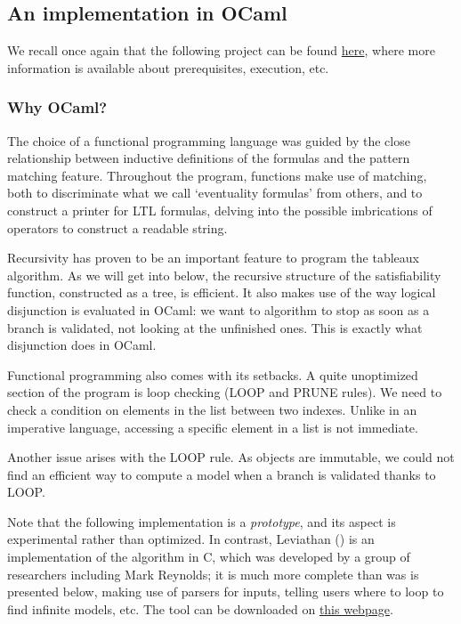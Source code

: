\documentclass[11pt]{article}
\def\CC{{C\nolinebreak[4]\hspace{-.05em}\raisebox{.4ex}{\tiny\bf ++}}}
\theoremstyle{definition}
\begin{document}
\subsection{An implementation in OCaml}

We recall once again that the following project can be found 
\href{https://github.com/anatcaramba/LTL-SAT-Solver-by-Reynolds-Tableaux}{here},
where more information is available about prerequisites, execution, etc.

\subsubsection*{Why OCaml?}
The choice of a functional programming language was guided by the close relationship
between inductive definitions of the formulas and the pattern matching feature.
Throughout the program, functions make use of matching, both to discriminate
what we call `eventuality formulas' from others, and to construct a printer
for LTL formulas, delving into the possible imbrications of operators to construct
a readable string.

Recursivity has proven to be an important feature to program the tableaux algorithm. 
As we will get into below, the recursive structure of the satisfiability function,
constructed as a tree, is efficient. It also makes use of the way logical disjunction
is evaluated in OCaml: we want to algorithm to stop as soon as a branch is validated,
not looking at the unfinished ones. This is exactly what disjunction does in OCaml.

Functional programming also comes with its setbacks. A quite unoptimized section of 
the program is loop checking (LOOP and PRUNE rules). We need to check a condition on 
elements in the list between two indexes. Unlike in an imperative language, accessing
a specific element in a list is not immediate. 

Another issue arises with the LOOP rule. As objects 
are immutable, we could not find an efficient way to compute a model when a branch is
validated thanks to LOOP. 

Note that the following implementation is a \emph{prototype}, and its aspect is 
experimental rather than optimized. In contrast, Leviathan (\cite{Leviathan})
is an implementation of the algorithm in \CC, which was developed by a group of researchers including Mark Reynolds;
it is much more complete than was is presented below, making use of parsers for inputs,
telling users where to loop to find infinite models, etc. The tool can be downloaded on \href{https://github.com/Corralx/leviathan}{this webpage}.
    
\end{document}
